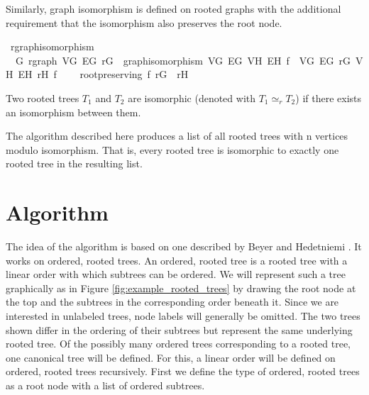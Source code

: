 Similarly, graph isomorphism is defined on rooted graphs with the additional requirement that the isomorphism also preserves the root node.

\begin{isabellebox}
    \isamarkupfalse%
    \ rgraph{\isacharunderscore}{\kern0pt}isomorphism\ {\isacharequal}{\kern0pt}\isanewline
    \ \ G{\isacharcolon}{\kern0pt}\ rgraph\ V\isactrlsub G\ E\isactrlsub G\ r\isactrlsub G\ {\isacharplus}{\kern0pt}\ graph{\isacharunderscore}{\kern0pt}isomorphism\ V\isactrlsub G\ E\isactrlsub G\ V\isactrlsub H\ E\isactrlsub H\ f\ \ V\isactrlsub G\ E\isactrlsub G\ r\isactrlsub G\ V\isactrlsub H\ E\isactrlsub H\ r\isactrlsub H\ f\ {\isacharplus}{\kern0pt}\isanewline
    \ \ \ root{\isacharunderscore}{\kern0pt}preserving{\isacharcolon}{\kern0pt}\ {\isachardoublequoteopen}f\ r\isactrlsub G\ {\isacharequal}{\kern0pt}\ r\isactrlsub H{\isachardoublequoteclose}
\end{isabellebox}

Two rooted trees $T_1$ and $T_2$ are isomorphic (denoted with $T_1 \simeq_r T_2$) if there exists an isomorphism between them.

The algorithm described here produces a list of all rooted trees with n vertices modulo isomorphism.
That is, every rooted tree is isomorphic to exactly one rooted tree in the resulting list.


\section{Algorithm}

The idea of the algorithm is based on one described by Beyer and Hedetniemi \parencite{beyer}.
It works on ordered, rooted trees.
An ordered, rooted tree is a rooted tree with a linear order with which subtrees can be ordered.
We will represent such a tree graphically as in Figure \ref{fig:example_rooted_trees} by drawing the root node at the top and the subtrees in the corresponding order beneath it.
Since we are interested in unlabeled trees, node labels will generally be omitted.
The two trees shown differ in the ordering of their subtrees but represent the same underlying rooted tree.
Of the possibly many ordered trees corresponding to a rooted tree, one canonical tree will be defined.
For this, a linear order will be defined on ordered, rooted trees recursively.
First we define the type of ordered, rooted trees as a root node with a list of ordered subtrees.

